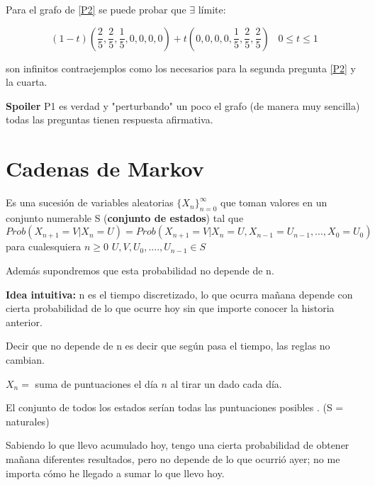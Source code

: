 \begin{obs}

Para el grafo de \ref{P2} se puede probar que $\exists$ límite:

$$(1-t)\left(\frac{2}{5},\frac{2}{5},\frac{1}{5},0,0,0,0\right) + t \left(0,0,0,0,\frac{1}{5},\frac{2}{5},\frac{2}{5}\right) \;\;\; 0 \leq t \leq 1 $$

son infinitos contraejemplos como los necesarios para la segunda pregunta \ref{P2} y la cuarta.

\end{obs}


\textbf{Spoiler} P1 es verdad y "perturbando" un poco el grafo (de manera muy sencilla) todas las preguntas tienen respuesta afirmativa.



\section{Cadenas de Markov}

\begin{defn}
	Es una sucesión de variables aleatorias $\{X_n\}_{n=0}^{\infty}$ que toman valores en un conjunto numerable S (\textbf{conjunto de estados}) tal que
	$$Prob(X_{n+1} = V | X_n = U) = Prob(X_{n+1} = V | X_n =U , X_{n-1} = U_{n-1} , ... , X_0 = U_0)$$
	para cualesquiera $n \geq 0$ $U,V,U_0,.... ,U_{n-1} \in S$
\end{defn}


\obs Además supondremos que esta probabilidad no depende de n.


\textbf{Idea intuitiva: } n es el tiempo discretizado, lo que ocurra mañana depende con cierta probabilidad de lo que ocurre hoy sin que importe conocer la historia anterior.

Decir que no depende de n es decir que según pasa el tiempo, las reglas no cambian.

\begin{example}
	$X_n =$ suma de puntuaciones el día $n$ al tirar un dado cada día.

	El conjunto de todos los estados serían todas las puntuaciones posibles . (S = naturales)

	Sabiendo lo que llevo acumulado hoy, tengo una cierta probabilidad de obtener mañana diferentes resultados, pero no depende de lo que ocurrió ayer; no me importa cómo he llegado a sumar lo que llevo hoy.
\end{example}

